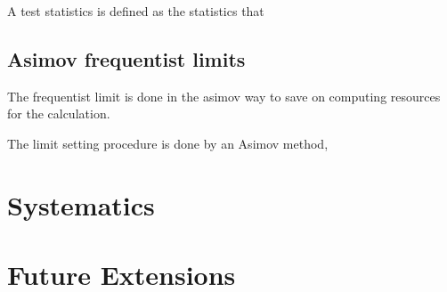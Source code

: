 A test statistics is defined as the statistics that 



\subsection{Asimov frequentist limits}
The frequentist limit is done in the asimov way to save on computing resources for the calculation. 

The limit setting procedure is done by an Asimov method, 

\section{Systematics}
\section{Future Extensions}


